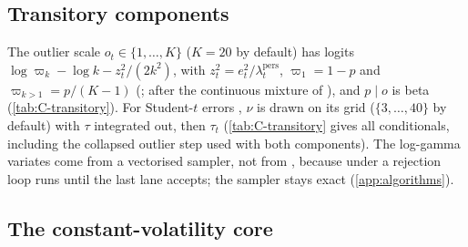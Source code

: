 \subsection{Transitory components}\label{sec:samp-transitory}

The outlier scale $o_t \in \{1, \dots, K\}$ ($K = 20$ by default) has logits
$\log\varpi_k - \log k - z_t^2/(2k^2)$, with $z_t^2 = e_t^2/\lambda^{\mathrm{pers}}_t$, $\varpi_1 = 1 - p$ and
$\varpi_{k > 1} = p/(K - 1)$ (\citealp{carriero2024addressing}; after the continuous mixture of
\citealp{stock2016core}), and $p \mid o$ is beta
(\cref{tab:C-transitory}). %
For Student-$t$ errors \citep{jacquier2004bayesian}, $\nu$ is drawn on its grid ($\{3, \dots, 40\}$ by
default) with $\tau$ integrated out, then $\tau_t$ (\cref{tab:C-transitory} gives all conditionals, including the collapsed
outlier step used with both components). %
The log-gamma variates come from a vectorised \citet{marsaglia2000simple} sampler, not from
, because under  a rejection loop runs until the last lane
accepts; the sampler stays exact (\cref{app:algorithms}). %

\subsection{The constant-volatility core}\label{sec:samp-constant}

